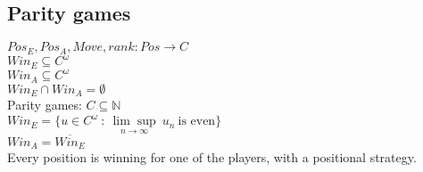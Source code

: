 \subsection*{Parity games}
$Pos_E, Pos_A, Move, rank : Pos \rightarrow C$\\
$Win_E \subseteq C^{\omega}$\\
$Win_A \subseteq C^{\omega}$\\
$Win_E \cap Win_A = \emptyset$\\
Parity games: $C \subseteq \mathbb{N}$\\
$Win_E = \{ u \in C^{\omega}\ :\ \underset{n \rightarrow \infty}{\lim\sup}\ u_n\ \text{is even} \}$\\
$Win_A = \overline{Win_E}$\\
Every position is winning for one of the players, with a positional strategy.

